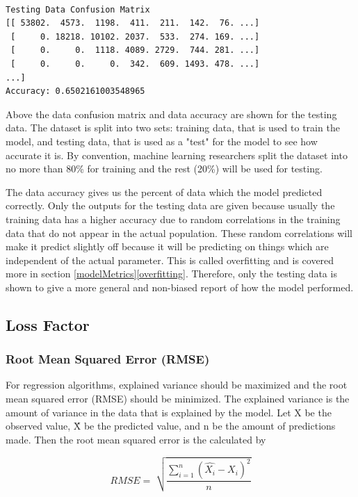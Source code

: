 \documentclass[9pt,twocolumn,twoside]{idsi}
\begin{document}
\begin{verbatim}

Testing Data Confusion Matrix
[[ 53802.  4573.  1198.  411.  211.  142.  76. ...]
 [     0. 18218. 10102. 2037.  533.  274. 169. ...]
 [     0.     0.  1118. 4089. 2729.  744. 281. ...]
 [     0.     0.     0.  342.  609. 1493. 478. ...]
...]
Accuracy: 0.6502161003548965

\end{verbatim}

Above the data confusion matrix and data accuracy are shown for the testing data. The dataset is split into two sets: training data, that is used to train the model, and testing data, that is used as a "test" for the model to see how accurate it is. By convention, machine learning researchers split the dataset into no more than 80\% for training and the rest (20\%) will be used for testing. 

The data accuracy gives us the percent of data which the model predicted correctly. Only the outputs for the testing data are given because usually the training data has a higher accuracy due to random correlations in the training data that do not appear in the actual population. These random correlations will make it predict slightly off because it will be predicting on things which are independent of the actual parameter. This is called overfitting and is covered more in section \ref{modelMetrics}\ref{overfitting}. Therefore, only the testing data is shown to give a more general and non-biased report of how the model performed.

\subsection{Loss Factor} \label{lossFactor}

\subsubsection{Root Mean Squared Error (RMSE)} \label{rmse}

For regression algorithms, explained variance should be maximized and the root mean squared error (RMSE) should be minimized. 
The explained variance is the amount of variance in the data that is explained by the model. Let X be the observed value, \^{X} be the predicted value, and n be the amount of predictions made. Then the root mean squared error is the calculated by 

\begin{equation}
RMSE =\sqrt[]{\frac{\sum_{i=1}^{n} (\hat{X_i} - X_i)^2}{n}}
\label{eq:rmse}
\end{equation}
\end{document}

